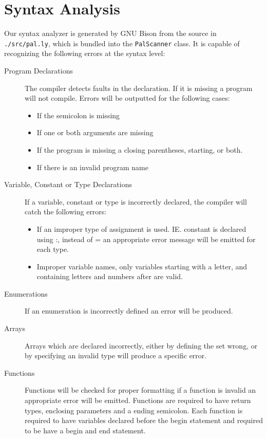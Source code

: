 \documentclass{article}
\begin{document}
\section*{Syntax Analysis}
Our syntax analyzer is generated by GNU Bison from the source in \texttt{./src/pal.ly}, which
is bundled into the \texttt{PalScanner} class. It is capable of recognizing the following
errors at the syntax level:

\begin{description}
  \item[Program Declarations]
	The compiler detects faults in the declaration. If it is missing a program
	will not compile. Errors will be outputted for the following cases:
		\begin{itemize}
			\item If the semicolon is missing
			\item If one or both arguments are missing
			\item If the program is missing a closing parentheses,
			starting, or both.
			\item If there is an invalid program name
		\end{itemize}
\item[Variable, Constant or Type Declarations]
	If a variable, constant or type is incorrectly declared, the compiler will
	catch the following errors:
		\begin{itemize}
			\item If an improper type of assignment is used. IE. 
			constant is declared using :, instead of = an appropriate
			error message will be emitted for each type.
			\item Improper variable names, only variables starting with
			a letter, and containing letters and numbers after are valid.
		\end{itemize}
		
\item[Enumerations]
	If an enumeration is incorrectly defined an error will be produced.
\item[Arrays]
	Arrays which are declared incorrectly, either by defining the set wrong, 
	or by specifying an invalid type will produce a specific error.
\item[Functions]	
	Functions will be checked for proper formatting if a function is invalid 
	an appropriate error will be emitted. Functions are required to have 
	return types, enclosing parameters and a ending semicolon. Each function 
	is required to have variables declared before the begin statement and required
	to be have a begin and end statement.
	

\end{description}
\end{document}
